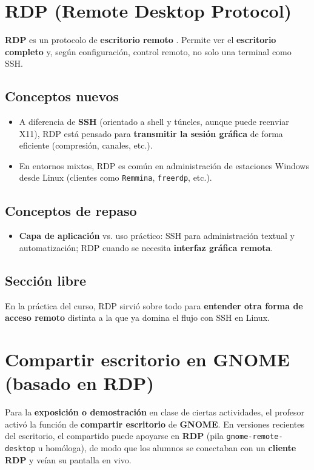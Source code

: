 \documentclass[11pt, letterpaper]{article}
\begin{document}
\section{RDP (Remote Desktop Protocol)}
\label{sec:org22d1201}

\textbf{RDP} es un protocolo de \textbf{escritorio remoto} . Permite ver el \textbf{escritorio completo} y, según configuración, control remoto, no solo una terminal como SSH.
\subsection{Conceptos nuevos}
\label{sec:org2d89b04}
\begin{itemize}
\item A diferencia de \textbf{SSH} (orientado a shell y túneles, aunque puede reenviar X11), RDP está pensado para \textbf{transmitir la sesión gráfica} de forma eficiente (compresión, canales, etc.).
\item En entornos mixtos, RDP es común en administración de estaciones Windows desde Linux (clientes como \texttt{Remmina}, \texttt{freerdp}, etc.).
\end{itemize}
\subsection{Conceptos de repaso}
\label{sec:org320e72e}
\begin{itemize}
\item \textbf{Capa de aplicación} vs. uso práctico: SSH para administración textual y automatización; RDP cuando se necesita \textbf{interfaz gráfica remota}.
\end{itemize}
\subsection{Sección libre}
\label{sec:org3f53173}
En la práctica del curso, RDP sirvió sobre todo para \textbf{entender otra forma de acceso remoto} distinta a la que ya domina el flujo con SSH en Linux.
\section{Compartir escritorio en GNOME (basado en RDP)}
\label{sec:orgc0d53bb}

Para la \textbf{exposición o demostración} en clase de ciertas actividades, el profesor activó la función de \textbf{compartir escritorio} de \textbf{GNOME}. En versiones recientes del escritorio, el compartido puede apoyarse en \textbf{RDP} (pila \texttt{gnome-remote-desktop} u homóloga), de modo que los alumnos se conectaban con un \textbf{cliente RDP} y veían su pantalla en vivo.
\end{document}

